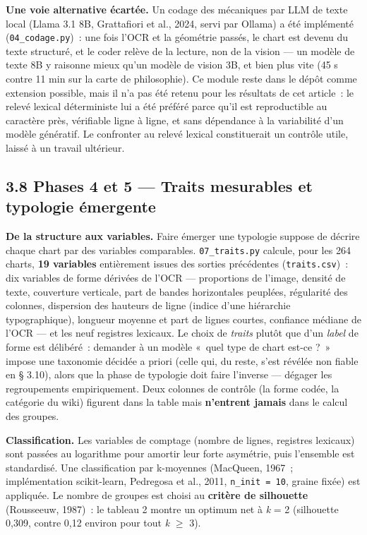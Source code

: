 \documentclass[11pt,a4paper]{article}
\begin{document}
\textbf{Une voie alternative écartée.} Un codage des mécaniques par LLM de texte local (Llama 3.1 8B, Grattafiori et al., 2024, servi par Ollama) a été implémenté (\texttt{04\_codage.py})~: une fois l'OCR et la géométrie passés, le chart est devenu du texte structuré, et le coder relève de la lecture, non de la vision --- un modèle de texte 8B y raisonne mieux qu'un modèle de vision 3B, et bien plus vite (45 s contre 11 min sur la carte de philosophie). Ce module reste dans le dépôt comme extension possible, mais il n'a pas été retenu pour les résultats de cet article~: le relevé lexical déterministe lui a été préféré parce qu'il est reproductible au caractère près, vérifiable ligne à ligne, et sans dépendance à la variabilité d'un modèle génératif. Le confronter au relevé lexical constituerait un contrôle utile, laissé à un travail ultérieur.

\subsection*{3.8 Phases 4 et 5 --- Traits mesurables et typologie émergente}

\textbf{De la structure aux variables.} Faire émerger une typologie suppose de décrire chaque chart par des variables comparables. \texttt{07\_traits.py} calcule, pour les 264 charts, \textbf{19 variables} entièrement issues des sorties précédentes (\texttt{traits.csv})~: dix variables de forme dérivées de l'OCR --- proportions de l'image, densité de texte, couverture verticale, part de bandes horizontales peuplées, régularité des colonnes, dispersion des hauteurs de ligne (indice d'une hiérarchie typographique), longueur moyenne et part de lignes courtes, confiance médiane de l'OCR --- et les neuf registres lexicaux. Le choix de \emph{traits} plutôt que d'un \emph{label} de forme est délibéré~: demander à un modèle «~quel type de chart est-ce ?~» impose une taxonomie décidée a priori (celle qui, du reste, s'est révélée non fiable en § 3.10), alors que la phase de typologie doit faire l'inverse --- dégager les regroupements empiriquement. Deux colonnes de contrôle (la forme codée, la catégorie du wiki) figurent dans la table mais \textbf{n'entrent jamais} dans le calcul des groupes.

\textbf{Classification.} Les variables de comptage (nombre de lignes, registres lexicaux) sont passées au logarithme pour amortir leur forte asymétrie, puis l'ensemble est standardisé. Une classification par k-moyennes (MacQueen, 1967~; implémentation scikit-learn, Pedregosa et al., 2011, \texttt{n\_init = 10}, graine fixée) est appliquée. Le nombre de groupes est choisi au \textbf{critère de silhouette} (Rousseeuw, 1987)~: le tableau 2 montre un optimum net à \emph{k} = 2 (silhouette 0,309, contre 0,12 environ pour tout \emph{k} $\geq$ 3).
\end{document}
